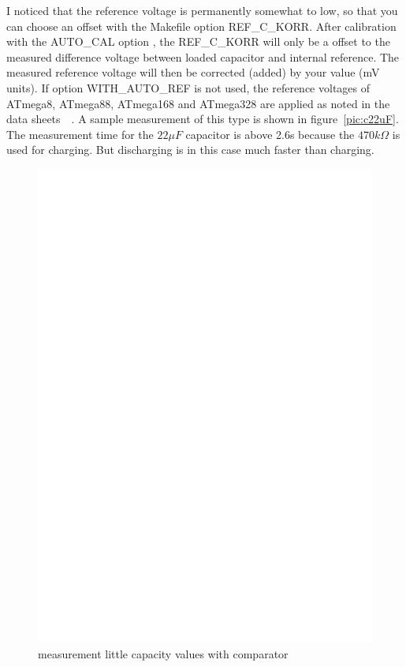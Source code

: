 I noticed that the reference voltage is permanently somewhat to low,
 so that you can choose an offset with the Makefile option REF\_C\_KORR.
After calibration with the AUTO\_CAL option , the REF\_C\_KORR will only be a offset to the measured difference voltage
between loaded capacitor and internal reference.
The measured reference voltage will then be corrected (added) by your value (mV units).
If option WITH\_AUTO\_REF is not used, the reference voltages of ATmega8, ATmega88, ATmega168 and ATmega328
are applied as noted in the data sheets~\cite{ATmega8}~\cite{ATmega168}. 
A sample measurement of this type is shown in figure~\ref{pic:c22uF}.
The measurement time for the \(22 \mu F\) capacitor is above 2.6s because the \(470k\Omega\) is
used for charging. But discharging is in this case much faster than charging.

\begin{figure}[H]
\centering
\includegraphics[]{../FIG/Comparat.eps}
\caption{measurement little capacity values with comparator}
\label{fig:comparat}
\end{figure}

